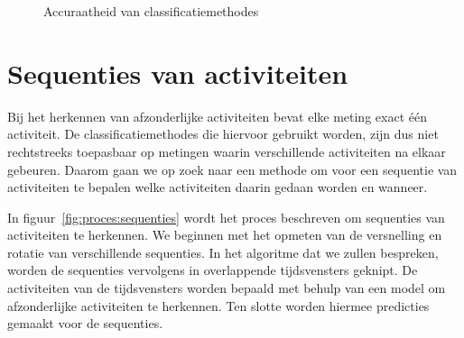 \documentclass{article}
\begin{document}
\begin{figure}[h]
\centering
{}
\caption{Accuraatheid van classificatiemethodes}
\label{fig:methodes}
\end{figure}

\newpage
\section{Sequenties van activiteiten}

Bij het herkennen van afzonderlijke activiteiten bevat elke meting exact \'e\'en activiteit. De classificatiemethodes die hiervoor gebruikt worden, zijn dus niet rechtstreeks toepasbaar op metingen waarin verschillende activiteiten na elkaar gebeuren. Daarom gaan we op zoek naar een methode om voor een sequentie van activiteiten te bepalen welke activiteiten daarin gedaan worden en wanneer.

In figuur~\ref{fig:proces:sequenties} wordt het proces beschreven om sequenties van activiteiten te herkennen. We beginnen met het opmeten van de versnelling en rotatie van verschillende sequenties. In het algoritme dat we zullen bespreken, worden de sequenties vervolgens in overlappende tijdsvensters geknipt. De activiteiten van de tijdsvensters worden bepaald met behulp van een model om afzonderlijke activiteiten te herkennen. Ten slotte worden hiermee predicties gemaakt voor de sequenties.
\end{document}

